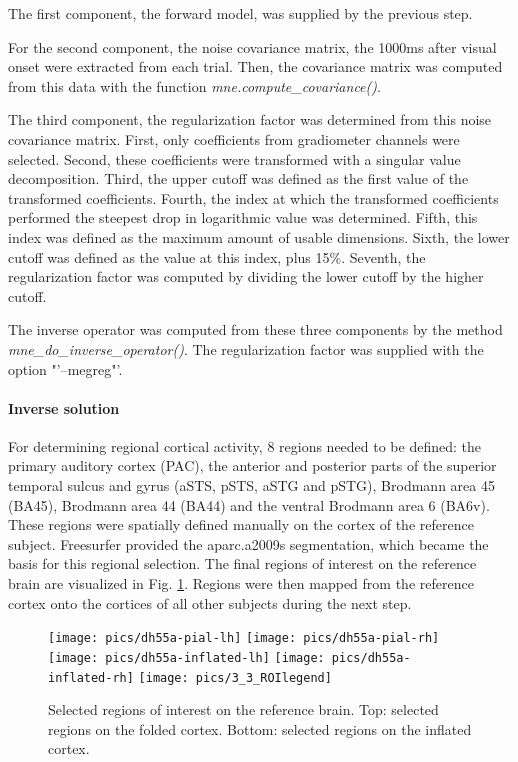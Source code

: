 The first component, the forward model, was supplied by the previous step.

For the second component, the noise covariance matrix, the 1000ms after visual onset were extracted from each trial.
Then, the covariance matrix was computed from this data with the function \emph{mne.compute\_covariance()}.

The third component, the regularization factor was determined from this noise covariance matrix.
First, only coefficients from gradiometer channels were selected.
Second, these coefficients were transformed with a singular value decomposition.
Third, the upper cutoff was defined as the first value of the transformed coefficients.
Fourth, the index at which the transformed coefficients performed the steepest drop in logarithmic value was determined.
Fifth, this index was defined as the maximum amount of usable dimensions.
Sixth, the lower cutoff was defined as the value at this index, plus 15\%.
Seventh, the regularization factor was computed by dividing the lower cutoff by the higher cutoff.


The inverse operator was computed from these three components by the method \linebreak \emph{mne\_do\_inverse\_operator()}. The regularization factor was supplied with the option \linebreak "'--megreg"'.

\paragraph{Inverse solution}
For determining regional cortical activity, 8 regions needed to be defined: the primary auditory cortex (PAC), the anterior and posterior parts of the superior temporal sulcus and gyrus (aSTS, pSTS, aSTG and pSTG), Brodmann area 45 (BA45), Brodmann area 44 (BA44) and the ventral Brodmann area 6 (BA6v).
These regions were spatially defined manually on the cortex of the reference subject.
Freesurfer provided the aparc.a2009s segmentation, which became the basis for this regional selection.
The final regions of interest on the reference brain are visualized in Fig. \ref{3.3.ROI}.
Regions were then mapped from the reference cortex onto the cortices of all other subjects during the next step.

\begin{figure}[h]
\begin{center}
\vspace{7mm}
\texttt{[image: pics/dh55a-pial-lh]}
\texttt{[image: pics/dh55a-pial-rh]}
\texttt{[image: pics/dh55a-inflated-lh]}
\texttt{[image: pics/dh55a-inflated-rh]}
\texttt{[image: pics/3\_3\_ROIlegend]}
\caption{\label{3.3.ROI} Selected regions of interest on the reference brain. Top: selected regions on the folded cortex. Bottom: selected regions on the inflated cortex.}
\end{center}
\end{figure}


